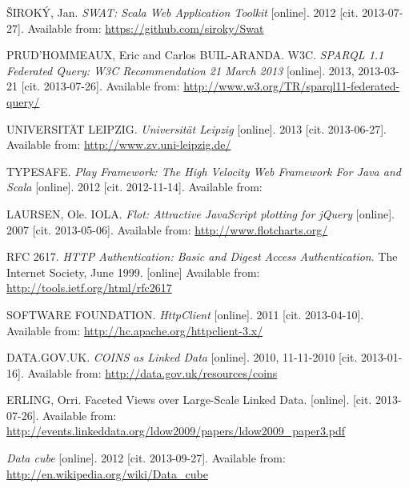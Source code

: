 \begin{thebibliography}{99}
{\sc ŠIROKÝ,} Jan. 
\emph{SWAT: Scala Web Application Toolkit} [online]. 2012 [cit. 2013-07-27].
Available from: \url{https://github.com/siroky/Swat}

{\sc PRUD'HOMMEAUX,} Eric and Carlos BUIL-ARANDA. W3C.
\emph{SPARQL 1.1 Federated Query: W3C Recommendation 21 March 2013} [online].
2013, 2013-03-21 [cit. 2013-07-26].
Available from: \url{http://www.w3.org/TR/sparql11-federated-query/}

{\sc UNIVERSITÄT LEIPZIG.} \emph{Universität Leipzig} [online]. 2013 [cit. 2013-06-27].
Available from: \url{http://www.zv.uni-leipzig.de/}

{\sc TYPESAFE.}
\emph{Play Framework: The High Velocity Web Framework For Java and Scala} [online].
2012 [cit. 2012-11-14]. 
Available from:  

{\sc LAURSEN,} Ole. IOLA. 
\emph{Flot: Attractive JavaScript plotting for jQuery} [online]. 2007 [cit. 2013-05-06].
Available from: \url{http://www.flotcharts.org/}

RFC 2617.
\emph{HTTP Authentication: Basic and Digest Access Authentication}.
The Internet Society, June 1999. [online]
Available from: \url{http://tools.ietf.org/html/rfc2617}

{\scAPACHE SOFTWARE FOUNDATION.}
\emph{HttpClient} [online]. 2011 [cit. 2013-04-10]. 
Available from: \url{http://hc.apache.org/httpclient-3.x/}

{\sc DATA.GOV.UK.}
\emph{COINS as Linked Data} [online]. 2010, 11-11-2010 [cit. 2013-01-16].
Available from: \url{http://data.gov.uk/resources/coins}

{\sc ERLING,} Orri.
Faceted Views over Large-Scale Linked Data.  [online]. [cit. 2013-07-26].
Available from: 
\url{http://events.linkeddata.org/ldow2009/papers/ldow2009_paper3.pdf}

\emph{Data cube} [online]. 2012 [cit. 2013-09-27]. 
Available from: \url{http://en.wikipedia.org/wiki/Data_cube}



\end{thebibliography}
